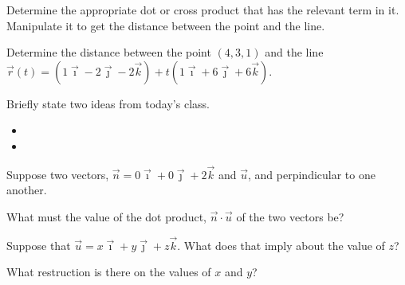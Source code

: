 \begin{problem}
\begin{subproblem}
    \item Determine the appropriate dot or cross product that has the relevant term in it. Manipulate it to get the distance between the point and the line.
      \vfill

  \end{subproblem}

  \clearpage

  \item Determine the distance between the point $(4,3,1)$ and the line $\vec{r}(t)=\left(1\vec{\imath}-2\vec{\jmath}-2\vec{k}\right)+t\left(1\vec{\imath}+6\vec{\jmath}+6\vec{k}\right)$.
    \vfill

\end{problem}


\postClass

\begin{problem}
\item Briefly state two ideas from today's class.
  \begin{itemize}
  \item
  \item
  \end{itemize}
\item
  \begin{subproblem}
    \item
  \end{subproblem}
\end{problem}



\begin{problem}
\item Suppose two vectors, $\vec{n}=0\vec{\imath}+0\vec{\jmath}+2\vec{k}$ and $\vec{u}$, and perpindicular to one another.
  \begin{subproblem}
    \item What must the value of the dot product, $\vec{n}\cdot\vec{u}$ of the two vectors be?
      \vfill
    \item Suppose that $\vec{u}=x\vec{\imath}+y\vec{\jmath}+z\vec{k}$.  What does that imply about the value of $z$?
      \vfill
    \item What restruction is there on the values of $x$ and $y$?
      \vfill
  \end{subproblem}
\end{problem}


